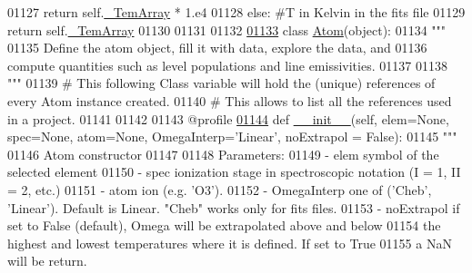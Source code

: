 \begin{DoxyCode}
{{01127                     \textcolor{keywordflow}{return} self.\hyperlink{classpyneb_1_1core_1_1pynebcore_1_1___coll_data_ascii_adb47c4cf2b9f3b82a281d0277e136693}{\_TemArray} * 1.e4
01128                 \textcolor{keywordflow}{else}: \textcolor{comment}{#T in Kelvin in the fits file}
01129                     \textcolor{keywordflow}{return} self.\hyperlink{classpyneb_1_1core_1_1pynebcore_1_1___coll_data_ascii_adb47c4cf2b9f3b82a281d0277e136693}{\_TemArray}
01130 
01131 
01132 
\hypertarget{pynebcore_8py_source_l01133}{}\hyperlink{classpyneb_1_1core_1_1pynebcore_1_1_atom}{01133} \textcolor{keyword}{class }\hyperlink{classpyneb_1_1core_1_1pynebcore_1_1_atom}{Atom}(object):
01134     \textcolor{stringliteral}{"""}
01135 \textcolor{stringliteral}{    Define the atom object, fill it with data, explore the data, and }
01136 \textcolor{stringliteral}{    compute quantities such as level populations and line emissivities.}
01137 \textcolor{stringliteral}{}
01138 \textcolor{stringliteral}{    """}
01139     \textcolor{comment}{# This following Class variable will hold the (unique) references of every Atom instance created.}
01140     \textcolor{comment}{# This allows to list all the references used in a project.}
01141     
01142     
01143     @profile
\hypertarget{pynebcore_8py_source_l01144}{}\hyperlink{classpyneb_1_1core_1_1pynebcore_1_1_atom_ad92916e464a9e193eb3e49b84f253a35}{01144}     \textcolor{keyword}{def }\hyperlink{classpyneb_1_1core_1_1pynebcore_1_1_atom_ad92916e464a9e193eb3e49b84f253a35}{\_\_init\_\_}(self, elem=None, spec=None, atom=None, OmegaInterp='Linear', noExtrapol = False):
01145         \textcolor{stringliteral}{"""}
01146 \textcolor{stringliteral}{        Atom constructor}
01147 \textcolor{stringliteral}{        }
01148 \textcolor{stringliteral}{        Parameters:}
01149 \textcolor{stringliteral}{            - elem          symbol of the selected element}
01150 \textcolor{stringliteral}{            - spec          ionization stage in spectroscopic notation (I = 1, II = 2, etc.)}
01151 \textcolor{stringliteral}{            - atom          ion (e.g. 'O3').}
01152 \textcolor{stringliteral}{            - OmegaInterp   one of ('Cheb', 'Linear'). Default is Linear. "Cheb" works only for fits files.
       }
01153 \textcolor{stringliteral}{            - noExtrapol    if set to False (default), Omega will be extrapolated above and below}
01154 \textcolor{stringliteral}{                            the highest and lowest temperatures where it is defined. If set to True}
01155 \textcolor{stringliteral}{                            a NaN will be return.}
}}
\end{DoxyCode}
